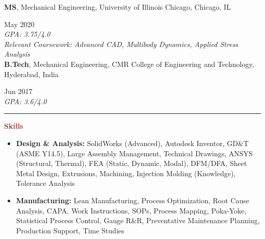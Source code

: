 \documentclass[11pt, letterpaper]{article}
\begin{document}
\textbf{MS}, Mechanical Engineering, University of Illinois Chicago, Chicago, IL \hfill \raggedright{May 2020}\\
\textit{GPA: 3.75/4.0}\\
\textit{Relevant Coursework: Advanced CAD, Multibody Dynamics, Applied Stress Analysis}\\ %
\vspace{6pt}
\textbf{B.Tech}, Mechanical Engineering, CMR College of Engineering and Technology, Hyderabad, India \hfill \raggedright{Jun 2017}\\
\textit{GPA: 3.6/4.0}\\
\vspace{-2pt}
 \noindent \rule[2pt]{\textwidth}{0.5pt}
\noindent \textbf{\large \textcolor{Brown}{Skills}}\vspace{2pt}\\
\begin{itemize}[leftmargin=*, label=\textbullet]
\setlength\itemsep{-2pt}
\vspace{-8pt}
\item \textbf{Design \& Analysis:} SolidWorks (Advanced), Autodesk Inventor, GD\&T (ASME Y14.5), Large Assembly Management, Technical Drawings, ANSYS (Structural, Thermal), FEA (Static, Dynamic, Modal), 
DFM/DFA, Sheet Metal Design, Extrusions, Machining, Injection Molding (Knowledge), Tolerance Analysis
\item \textbf{Manufacturing:} Lean Manufacturing, Process Optimization, Root Cause Analysis, CAPA, Work Instructions, SOPs, Process Mapping, Poka-Yoke, Statistical Process Control, Gauge R\&R, Preventative Maintenance Planning, Production Support, Time Studies
\end{itemize}
\end{document}
